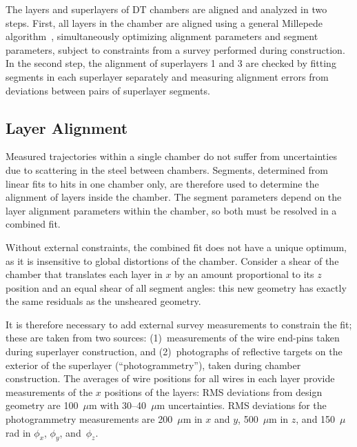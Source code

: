 \documentclass[11pt,twoside,a4paper,cmspaper]{cms-tdr}
\begin{document}
The layers and superlayers of DT chambers are aligned and analyzed in
two steps.  First, all layers in the chamber are aligned using a general Millepede
algorithm~\cite{Blobel:2006yh}, simultaneously optimizing alignment
parameters and segment parameters, subject to constraints from a
survey performed during construction.  In the second step, the
alignment of superlayers 1 and 3 are checked by fitting
segments in each superlayer separately and measuring alignment
errors from deviations between pairs of superlayer segments.

\subsection{Layer Alignment}
\label{sec:localdt1}

Measured trajectories within a single chamber do not suffer
from uncertainties due to scattering in the steel between chambers.  Segments,
determined from linear fits to hits in one chamber only, are therefore used to
determine the alignment of layers inside the chamber.  The segment parameters
depend on the layer alignment parameters within the chamber, so
both must be resolved in a combined fit.

Without external constraints, the combined fit does not have a unique
optimum, as it is insensitive to global distortions of the chamber.
Consider a shear of the chamber that translates each layer in $x$ by
an amount proportional to its $z$ position and an equal shear of all
segment angles: this new geometry has exactly the same residuals as the
unsheared geometry.

It is therefore necessary to add external survey measurements to
constrain the fit; these are taken from two sources: (1)~measurements
of the wire end-pins taken during superlayer
construction, and (2)~photographs of reflective targets
on the exterior of the superlayer (``photogrammetry''), taken during
chamber construction.  The averages of wire positions for all wires in
each layer provide measurements of the $x$ positions of the layers:
RMS deviations from design geometry are 100~$\mu$m with 30--40~$\mu$m
uncertainties.  RMS deviations for the photogrammetry measurements
are 200~$\mu$m in $x$ and $y$, 500~$\mu$m in $z$, and 150~$\mu$rad in
$\phi_x$, $\phi_y$, and~$\phi_z$.
\end{document}
